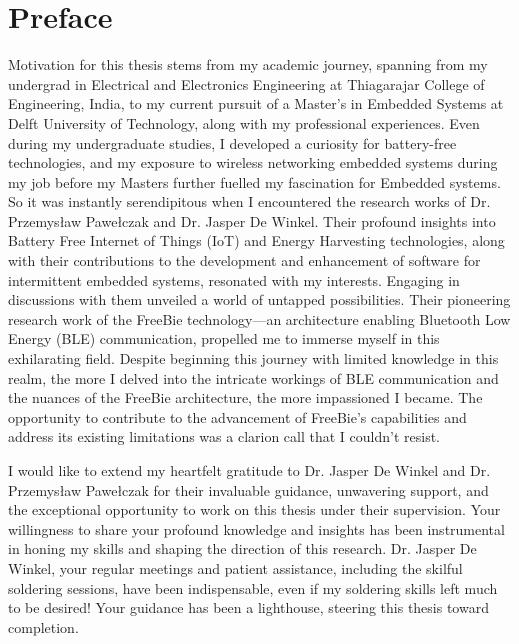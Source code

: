 \chapter*{Preface}

Motivation for this thesis stems from my academic journey, spanning from my undergrad in Electrical and Electronics Engineering at Thiagarajar College of Engineering, India, to my current pursuit of a Master's in Embedded Systems at Delft University of Technology, along with my professional experiences. Even during my undergraduate studies, I developed a curiosity for battery-free technologies, and my exposure to wireless networking embedded systems during my job before my Masters further fuelled my fascination for Embedded systems. So it was instantly serendipitous when I encountered the research works of Dr. Przemysław Pawełczak and Dr. Jasper De Winkel. Their profound insights into Battery Free Internet of Things (IoT) and Energy Harvesting technologies, along with their contributions to the development and enhancement of software for intermittent embedded systems, resonated with my interests. Engaging in discussions with them unveiled a world of untapped possibilities. Their pioneering research work of  the FreeBie technology—an architecture enabling Bluetooth Low Energy (BLE) communication, propelled me to immerse myself in this exhilarating field. Despite beginning this journey with limited knowledge in this realm, the more I delved into the intricate workings of BLE communication and the nuances of the FreeBie architecture, the more impassioned I became. The opportunity to contribute to the advancement of FreeBie's capabilities and address its existing limitations was a clarion call that I couldn't resist.
\vspace{1\baselineskip}

\noindent I would like to extend my heartfelt gratitude to Dr. Jasper De Winkel and  Dr. Przemysław Pawełczak for their invaluable guidance, unwavering support, and the exceptional opportunity to work on this thesis under their supervision. Your willingness to share your profound knowledge and insights has been instrumental in honing my skills and shaping the direction of this research. Dr. Jasper De Winkel, your regular meetings and patient assistance, including the skilful soldering sessions, have been indispensable, even if my soldering skills left much to be desired! Your guidance has been a lighthouse, steering this thesis toward completion.
\vspace{1\baselineskip}

